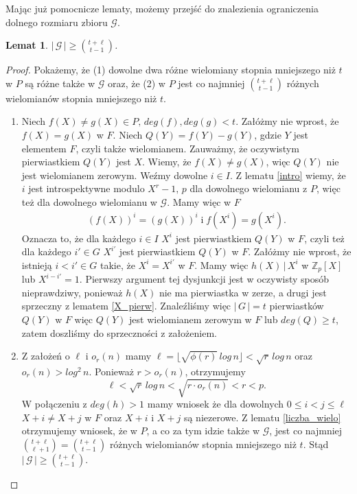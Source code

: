 \documentclass[declaration,shortabstract]{iithesis}
\theoremstyle{definition}
\theoremstyle{remark} \newtheorem{observation}{Obserwacja}
\theoremstyle{plain} \newtheorem{theorem}{Twierdzenie}
\theoremstyle{plain} \newtheorem{lemma}{Lemat}
\theoremstyle{remark} \newtheorem*{remark*}{Uwaga}
\theoremstyle{reminder} \newtheorem*{reminder*}{Przypomnienie}
\begin{document}
Mając już pomocnicze lematy, możemy przejść do znalezienia ograniczenia dolnego rozmiaru zbioru $\mathcal{G}$.
	
\begin{lemma} \label{lower}
	$| \, \mathcal{G} \,| \geq {t + \ell \choose t - 1}$.
\end{lemma}
	
\begin{proof}
	Pokażemy, że (1) dowolne dwa różne wielomiany stopnia mniejszego niż $t$ w $P$ są różne także w $\mathcal{G}$ oraz, że (2) w $P$ jest co najmniej  ${t + \ell \choose t - 1}$ różnych wielomianów stopnia mniejszego niż $t$. 
	\begin{enumerate}[label=(\arabic*),leftmargin=.4in]
	\item Niech $f(X) \neq g(X) \in P, \, deg(f), deg(g) < t$. Załóżmy nie wprost, że $f(X) = g(X)$ w $F$. 
    Niech $Q(Y) = f(Y) - g(Y)$, gdzie $Y$ jest elementem $F$, czyli także wielomianem. Zauważmy, że oczywistym pierwiastkiem $Q(Y)$ jest $X$. Wiemy, że $f(X) \neq g(X)$, więc $Q(Y)$ nie jest wielomianem zerowym. Weźmy dowolne $i \in I$. Z lematu \ref{intro} wiemy, że $i$ jest introspektywne modulo $X^r - 1, \, p$ dla dowolnego wielomianu z $P$, więc też dla dowolnego wielomianu w $\mathcal{G}$. Mamy więc w $F$
    \begin{align*}
        (f(X))^i = (g(X))^i \; \text{i} \; f(X^i) = g(X^i).
    \end{align*}
    Oznacza to, że dla każdego $i \in I$ $X^i$ jest pierwiastkiem $Q(Y)$ w $F$, czyli też dla każdego $i' \in G$ $X^{i'}$ jest pierwiastkiem $Q(Y)$ w $F$. Załóżmy nie wprost, że istnieją $i < i' \in G$ takie, że $X^i = X^{i'}$ w $F$. Mamy więc $h(X) \, | \, X^i$ w $\mathbb{Z}_p[X]$ lub $X^{i - i'} = 1$. Pierwszy argument tej dysjunkcji jest w oczywisty sposób nieprawdziwy, ponieważ $h(X)$ nie ma pierwiastka w zerze, a drugi jest sprzeczny z lematem \ref{X_pierw}.
	Znaleźliśmy więc $|\,G\,| = t$ pierwiastków $Q(Y)$ w $F$ więc $Q(Y)$ jest wielomianem zerowym w $F$ lub $deg(Q) \geq t$, zatem doszliśmy do sprzeczności z założeniem.
	\item Z założeń o $\ell$ i $o_r(n)$ mamy $\ell = \lfloor \sqrt{\phi(r)} \, log\, n \rfloor < \sqrt{r} \, log \, n $ oraz $o_r(n) > log^2 \, n$. Ponieważ $r > o_r(n)$, otrzymujemy \[\ell < \sqrt{r} \, log \, n < \sqrt{r \cdot o_r(n)} < r < p.\] W połączeniu z $deg(h) > 1$ mamy wniosek że dla dowolnych $0 \leq i < j \leq \ell$ $X + i \neq X + j$ w $F$ oraz $X + i$ i $X + j$ są niezerowe. 
    \newline Z lematu \ref{liczba_wielo} otrzymujemy wniosek, że w $P$, a co za tym idzie także w $\mathcal{G}$, jest co najmniej ${t + \ell \choose \ell + 1} = {t + \ell \choose t - 1}$ różnych wielomianów stopnia mniejszego niż $t$. Stąd $| \, \mathcal{G} \, | \geq {t + \ell \choose t - 1}$.
    \end{enumerate}
\end{proof}
    
\end{document}
